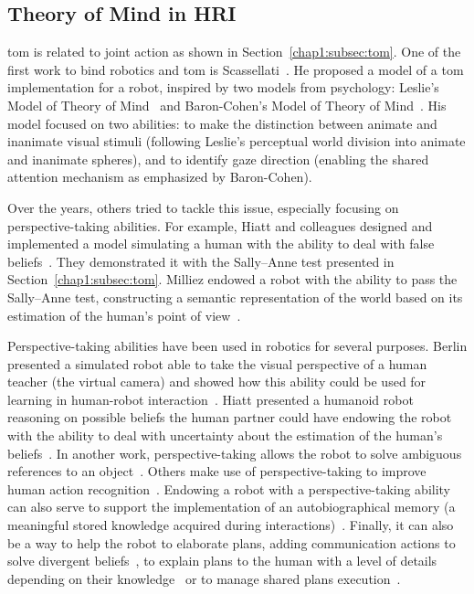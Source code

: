 \documentclass[a4paper,11pt,twoside]{StyleThese}
\begin{document}
\subsection{Theory of Mind in HRI}\label{chap2:subsec:tom_hri}
\acrfull{tom} is related to joint action as shown in Section~\ref{chap1:subsec:tom}. One of the first work to bind robotics and \acrshort{tom} is Scassellati~\cite{scassellati_2002_theory}. He proposed a model of a \acrshort{tom} implementation for a robot, inspired by two models from psychology: Leslie’s Model of Theory of Mind~\cite{leslie_1984_spatiotemporal} and Baron-Cohen’s Model of Theory of Mind~\cite{baron-cohen_1995_mindblindness}. His model focused on two abilities: to make the distinction between animate and inanimate visual stimuli (following Leslie's perceptual world division into animate and inanimate spheres), and to identify gaze direction (enabling the shared attention mechanism as emphasized by Baron-Cohen). 

Over the years, others tried to tackle this issue, especially focusing on perspective-taking abilities. For example, Hiatt and colleagues designed and implemented a model simulating a human with the ability to deal with false beliefs~\cite{hiatt_2010_cognitive}. They demonstrated it with the Sally--Anne test presented in Section~\ref{chap1:subsec:tom}. Milliez \etal{} endowed a robot with the ability to pass the Sally--Anne test, constructing a semantic representation of the world based on its estimation of the human's point of view~\cite{milliez_2014_framework}.

Perspective-taking abilities have been used in robotics for several purposes. Berlin \etal{} presented a simulated robot able to take the visual perspective of a human teacher (the virtual camera) and showed how this ability could be used for learning in human-robot interaction~\cite{berlin_2006_perspective}. Hiatt \etal{} presented a humanoid robot reasoning on possible beliefs the human partner could have endowing the robot with the ability to deal with uncertainty about the estimation of the human's beliefs~\cite{hiatt_2011_accommodating}. In another work, perspective-taking allows the robot to solve ambiguous references to an object~\cite{ros_2010_solving}. Others make use of perspective-taking to improve human action recognition~\cite{johnson_2005_perceptual}. Endowing a robot with a perspective-taking ability can also serve to support the implementation of an autobiographical memory (a meaningful stored knowledge acquired during interactions)~\cite{pointeau_2017_role}. Finally, it can also be a way to help the robot to elaborate plans, adding communication actions to solve divergent beliefs~\cite{warnier_2012_robot}, to explain plans to the human with a level of details depending on their knowledge~\cite{milliez_2016_using} or to manage shared plans execution~\cite{devin_2016_implemented}.
\end{document}
